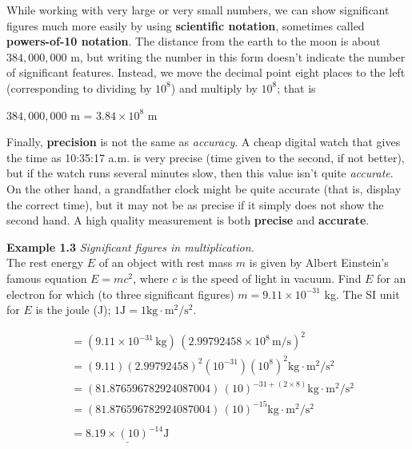 While working with very large or very small numbers, we can show significant figures much more easily by using \textbf{scientific notation}, sometimes called \textbf{powers-of-10 notation}. The distance from the earth to the moon is about $384,000,000$ m, but writing the number in this form doesn't indicate the number of significant features. Instead, we move the decimal point eight places to the left (corresponding to dividing by $10^8$) and multiply by $10^8$; that is\\
\begin{center}
$384,000,000$ m = $3.84 \times 10^8$ m
\end{center}

Finally, \textbf{precision} is not the same as \textit{accuracy}. A cheap digital watch that gives the time as 10:35:17 a.m. is very precise (time given to the second, if not better), but if the watch runs several minutes slow, then this value isn't quite \textit{accurate}. On the other hand, a grandfather clock might be quite accurate (that is, display the correct time), but it may not be as precise if it simply does not show the second hand. A high quality measurement is both \textbf{precise} and \textbf{accurate}.

\begin{examplebox}
\textbf{Example 1.3} \textit{Significant figures in multiplication.}\\

The rest energy $E$ of an object with rest mass $m$ is given by Albert Einstein's famous equation $E = mc^2$, where $c$ is the speed of light in vacuum. Find $E$ for an electron for which (to three significant figures) $m = 9.11 \times 10^{-31}$ kg. The SI unit for $E$ is the joule (J); $1 \text{J} = 1 \text{kg} \cdot \text{m}^2 / \text{s}^2$.
\bigskip
\begin{mathbox}
\begin{align*}
&= \left(9.11 \times 10^{-31} \, \text{kg}\right) \, \left(2.99792458 \times 10^{8} \, \text{m/s}\right)^{2} \\
&= \left(9.11\right)\left(2.99792458\right)^2 \left(10^{-31}\right) \left(10^8\right)^2 \text{kg} \cdot \text{m}^2\text{/}\text{s}^2 \\
&= \left(81.876596782924087004\right) \, \left(10\right)^{-31 + \left(2 \times 8\right)} \text{kg} \cdot \text{m}^2\text{/}\text{s}^2 \\
&= \left(81.876596782924087004\right) \, \left(10\right)^{-15} \text{kg} \cdot \text{m}^2\text{/}\text{s}^2 \\ \\
&= \underline{8.19 \times \left(10\right)^{-14} \text{J}}
\end{align*}
\end{mathbox}
\end{examplebox}

